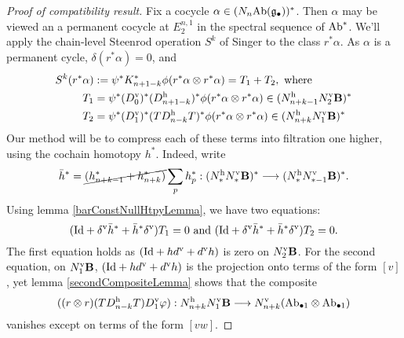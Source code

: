 \documentclass[10pt]{article}
\begin{document}
\begin{Lie Steenrods satisfy the Adem relation}
\begin{proof}[Proof of compatibility result]
Fix a cocycle $\alpha\in (N_{n}\textup{Ab}(\frakg_\bullet))^*$. %
Then $\alpha$ may be viewed an a permanent cocycle at $E_2^{n,1}$ in the spectral sequence of $\textup{Ab}^*$. We'll apply the chain-level Steenrod operation $S^k$ of Singer to the class $r^*\alpha$. As $\alpha$ is a permanent cycle, $\delta(r^*\alpha)=0$, and
\begin{alignat*}{2}
S^k(r^*\alpha)&:=\psi^*K^*_{n+1-k}\oldphi(r^*\alpha\otimes r^*\alpha)=T_1+T_2,\textup{ where}
\\
T_1
&=
\psi^*(D^\textup{v}_0)^*(D^\textup{h}_{n+1-k})^*
\oldphi(r^*\alpha\otimes r^*\alpha)\in (N^\textup{h}_{n+k-1}N^\textup{v}_2\textbf{B})^*%
\\
T_2
&=
\psi^*(D^\textup{v}_1)^*(TD^\textup{h}_{n-k}T)^*
\oldphi(r^*\alpha\otimes r^*\alpha)\in (N^\textup{h}_{n+k}N^\textup{v}_1\textbf{B})^*
\end{alignat*}
%
Our method will be to compress each of these terms into filtration one higher, using the cochain homotopy $h^*$. Indeed, write 
\[\bar{h}^*=\cancel{(h^*_{n+k-1}+h^*_{n+k})}\sum_ph^*_p:(N^\textup{h}_*N^\textup{v}_*\textbf{B})^*\to (N^\textup{h}_*N^\textup{v}_{*-1}\textbf{B})^*.\]
Using lemma \ref{barConstNullHtpyLemma}, we have two equations:
\[(\textup{Id}+\delta^\textup{v}\bar{h}^*+ \bar{h}^*\delta^\textup{v})T_1=0\textup{ and }(\textup{Id}+\delta^\textup{v}\bar{h}^*+ \bar{h}^*\delta^\textup{v})T_2=0.\]
The first equation holds as $(\textup{Id}+hd^\textup{v}+d^\textup{v}h)$ is zero on $N^\textup{v}_2\textbf{B}$. For the second equation, on $N^\textup{v}_1\textbf{B}$,  $(\textup{Id}+hd^\textup{v}+d^\textup{v}h)$ is the projection onto terms of the form $[v]$, yet lemma \ref{secondCompositeLemma} shows that the composite
\[((r\otimes r)\circ(TD^\textup{h}_{n-k}T)\circ D^\textup{v}_1\circ\phi): N^\textup{h}_{n+k}N^\textup{v}_1\textbf{B}\to N^\textup{v}_{n+k}(\textup{Ab}_{\bullet1}\otimes \textup{Ab}_{\bullet1})\]
vanishes except on terms of the form $[vw]$.







\end{proof}
\end{Lie Steenrods satisfy the Adem relation}
\end{document}
